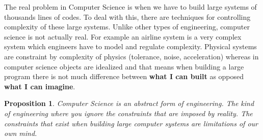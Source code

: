 \documentclass[a4paper,twoside]{article}
\newtheorem{proposition}[theorem]{Proposition}
\numberwithin{equation}{section}
\begin{document}
The real problem in Computer Science is when we have to build large systems of thousands lines of
codes. To deal with this, there are techniques for controlling complexity of these large systems.
Unlike other types of engineering, computer science is not actually real. For example an airline
system is a very complex system which engineers have to model and regulate complexity. Physical
systems are constraint by complexity of physics (tolerance, noise, acceleration) whereas in computer
science objects are idealized and that means when building a large program there is not much difference
between \textbf{what I can built} as opposed \textbf{what I can imagine}.
\begin{proposition}
    Computer Science is an abstract form of engineering. The kind of engineering where you ignore the
    constraints that are imposed by reality. The constraints that exist when building large computer
    systems are limitations of our own mind.
\end{proposition}
\end{document}
